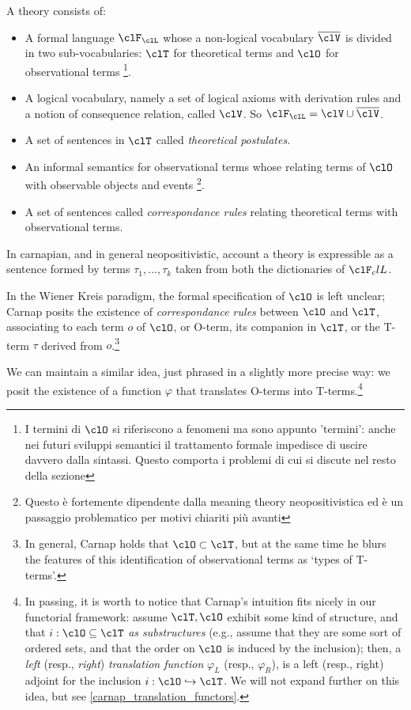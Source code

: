 \begin{definition} \cite{krause-foundation}
	A theory consists of:
	\begin{itemize}
	\item A formal language $\clF_\clL$ whose a non-logical vocabulary $\overline{\clV}$ is divided in two sub-vocabularies: $\clT$ for theoretical terms and $\clO$ for observational terms \footnote{I termini di $\clO$ si riferiscono a fenomeni ma sono appunto 'termini': anche nei futuri sviluppi semantici il trattamento formale impedisce di uscire davvero dalla sintassi. Questo comporta i problemi di cui si discute nel resto della sezione}. 
	\item A logical vocabulary, namely a set of logical axioms with derivation rules and a notion of consequence relation, called $\clV$. So $\clF_\clL= \clV \cup \overline{\clV}$.
	\item A set of sentences in $\clT$ called \emph{theoretical postulates}.
	\item An informal semantics for observational terms whose relating terms of $\clO$ with observable objects and events \footnote{Questo è fortemente dipendente dalla meaning theory neopositivistica \cite{} ed è un passaggio problematico per motivi chiariti più avanti}. 
	\item A set of sentences called \emph{correspondance rules} relating theoretical terms with observational terms. 
	\end{itemize}    
\end{definition}

In carnapian, and in general neopositivistic, account a theory is expressible as a sentence formed by terms $\tau_1, \dots, \tau_k$ taken from both the dictionaries of $\clF_clL$. 

In the Wiener Kreis paradigm, the formal specification of $\clO$ is left unclear; Carnap \cite{carnapfound} posits the existence of \emph{correspondance rules} between $\clO$ and $\clT$, associating to each term $o$ of $\clO$, or O-term, its companion in $\clT$, or the T-term $\tau$ derived from $o$.\footnote{In general, Carnap holds that $\clO \subset \clT$, but at the same time he blurs the features of this identification of observational terms as `types of T-terms'.}

We can maintain a similar idea, just phrased in a slightly more precise way: we posit the existence of a function $\varphi$ that translates O-terms into T-terms.\footnote{In passing, it is worth to notice that Carnap's intuition fits nicely in our functorial framework: assume $\clT, \clO$ exhibit some kind of structure, and that $i : \clO\subseteq\clT$ \emph{as substructures} (e.g., assume that they are some sort of ordered sets, and that the order on $\clO$ is induced by the inclusion); then, a \emph{left} (resp., \emph{right}) \emph{translation function} $\varphi_L$ (resp., $\varphi_R$), is a left (resp., right) adjoint for the inclusion $i : \clO\hookrightarrow \clT$. We will not expand further on this idea, but see \autoref{carnap_translation_functors}.}

